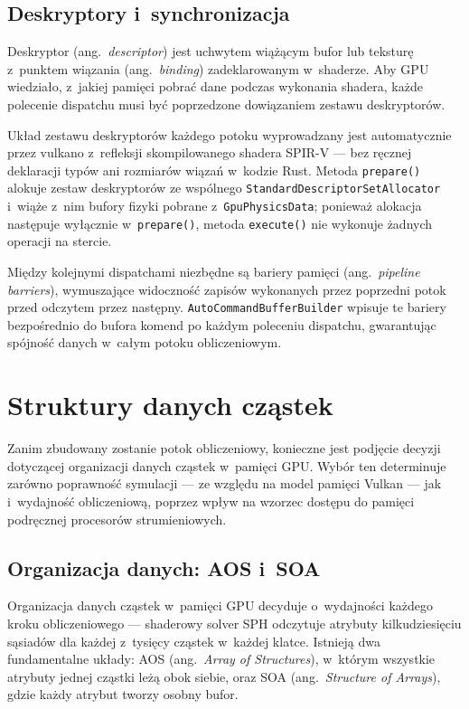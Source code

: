 \subsection{Deskryptory i~synchronizacja}
\label{subsec:descriptors}

Deskryptor (ang.~\textit{descriptor}) jest uchwytem wiążącym bufor lub
teksturę z~punktem wiązania (ang.~\textit{binding}) zadeklarowanym
w~shaderze. Aby GPU wiedziało, z~jakiej pamięci pobrać dane podczas
wykonania shadera, każde polecenie dispatchu musi być poprzedzone
dowiązaniem zestawu deskryptorów.

Układ zestawu deskryptorów każdego potoku wyprowadzany jest automatycznie
przez vulkano z~refleksji skompilowanego shadera SPIR-V --- bez ręcznej
deklaracji typów ani rozmiarów wiązań w~kodzie Rust. Metoda
\texttt{prepare()} alokuje zestaw deskryptorów ze wspólnego
\texttt{StandardDescriptorSetAllocator} i~wiąże z~nim bufory fizyki
pobrane z~\texttt{GpuPhysicsData}; ponieważ alokacja następuje wyłącznie
w~\texttt{prepare()}, metoda \texttt{execute()} nie wykonuje żadnych
operacji na stercie.

Między kolejnymi dispatchami niezbędne są bariery pamięci
(ang.~\textit{pipeline barriers}), wymuszające widoczność zapisów
wykonanych przez poprzedni potok przed odczytem przez następny.
\texttt{AutoCommandBufferBuilder} wpisuje te bariery bezpośrednio
do bufora komend po każdym poleceniu dispatchu, gwarantując spójność
danych w~całym potoku obliczeniowym.

\section{Struktury danych cząstek}
\label{sec:data_structures}

Zanim zbudowany zostanie potok obliczeniowy, konieczne jest podjęcie
decyzji dotyczącej organizacji danych cząstek w~pamięci GPU.
Wybór ten determinuje zarówno poprawność symulacji --- ze względu na model
pamięci Vulkan --- jak i~wydajność obliczeniową, poprzez wpływ na wzorzec
dostępu do pamięci podręcznej procesorów strumieniowych.

\subsection{Organizacja danych: AOS i~SOA}
\label{subsec:soa_aos}

Organizacja danych cząstek w~pamięci GPU decyduje o~wydajności każdego
kroku obliczeniowego --- shaderowy solver SPH odczytuje atrybuty
kilkudziesięciu sąsiadów dla każdej z~tysięcy cząstek w~każdej klatce.
Istnieją dwa fundamentalne układy: AOS (ang.~\textit{Array of Structures}),
w~którym wszystkie atrybuty jednej cząstki leżą obok siebie, oraz SOA
(ang.~\textit{Structure of Arrays}), gdzie każdy atrybut tworzy osobny
bufor.

